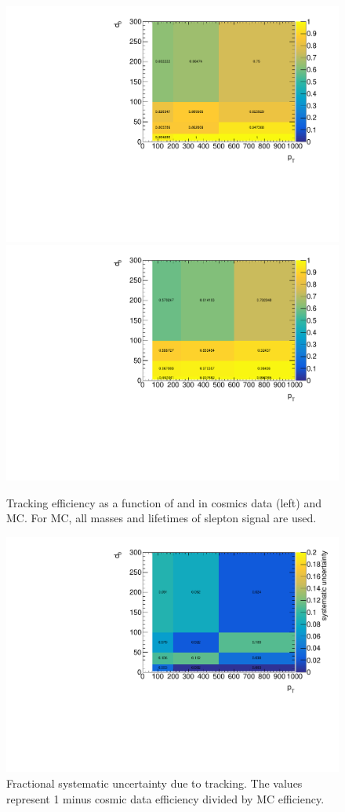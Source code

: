 \begin{figure}[htbp]
\centering
\includegraphics[width=.48\textwidth]{figures/LRT_systs/cosmics_rp3_dzp20_zzp20_z0120_Rgd0_timing_idcuts_eff_pt_d0.pdf}
\includegraphics[width=.48\textwidth]{figures/LRT_systs/signal_eff_pt_d0_allmu_rp05_pt30_Rd0_allmass.pdf}
\caption{Tracking efficiency as a function of \pt and \dz in cosmics data (left) and MC. For MC, all masses and lifetimes of slepton signal are used.}
\label{fig:applrt_syst}
\end{figure}

\begin{figure}[htbp]
\centering
\includegraphics[width=.8\textwidth]{figures/LRT_systs/compare_pt_d0_z0120_Rgd0_timing_idcuts.pdf}
\caption{Fractional systematic uncertainty due to tracking. The values represent 1 minus cosmic data efficiency divided by MC efficiency. }
\label{fig:lrt_syst}
\end{figure}

